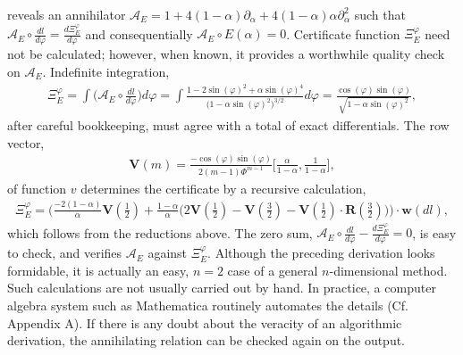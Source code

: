 \documentclass[nofootinbib,preprint]{revtex4-1}
\begin{document}
reveals an annihilator 
$\mathcal{A}_E = 1 + 4(1-\alpha)\partial_{\alpha} + 4(1-\alpha)\alpha\partial_{\alpha}^2$ such
that $\mathcal{A}_E \circ \frac{dl}{d\varphi} = \frac{d\Xi_E^{\varphi}}{d\varphi}$ and consequentially
$\mathcal{A}_E \circ E(\alpha) = 0$. Certificate function $\Xi_E^{\varphi}$ need not be calculated; 
however, when known, it provides a worthwhile quality check on $\mathcal{A}_E$. Indefinite 
integration, 
\begin{eqnarray}
\Xi_E^{\varphi} = \int \bigg(\mathcal{A}_E \circ \frac{dl}{d\varphi}\bigg) d\varphi 
=\int \frac{1-2\sin(\varphi)^2+\alpha \sin(\varphi)^4}{\big(1-\alpha \sin(\varphi)^2\big)^{3/2}} d\varphi
=  \frac{\cos(\varphi)\sin(\varphi)}{\sqrt{1-\alpha \sin(\varphi)^2}}, \nonumber
\end{eqnarray}
after careful bookkeeping, must agree with a total of exact differentials. The row vector,
\begin{eqnarray}
\mathbf{V}(m)=\frac{-\cos(\varphi)\sin(\varphi)}{2(m-1)\Phi^{m-1}}\bigg[\frac{\alpha}{1-\alpha},\frac{1}{1-\alpha}\bigg], \nonumber
\end{eqnarray}
of function $v$ determines the certificate by a recursive calculation,
\begin{eqnarray}
\Xi_E^{\varphi} = \Bigg(\frac{-2(1-\alpha)}{\alpha}\mathbf{V}(\tfrac{1}{2})
+\frac{1-\alpha}{\alpha}\Big(2\mathbf{V}(\tfrac{1}{2})
-\mathbf{V}(\tfrac{3}{2})-\mathbf{V}(\tfrac{1}{2})\cdot
\mathbf{R}(\tfrac{3}{2}) \Big) \Bigg) \cdot \mathbf{w}(dl), 
\nonumber
\end{eqnarray}
which follows from the reductions above. The zero sum, 
$\mathcal{A}_E \circ \frac{dl}{d\varphi}-\frac{d\Xi_E^{\varphi}}{d\varphi}=0$, is 
easy to check, and verifies $\mathcal{A}_E$ against $\Xi_E^{\varphi}$.
Although the preceding derivation looks formidable, it is actually an 
easy, $n=2$ case of a general $n$-dimensional 
method. Such calculations are not usually carried out by hand. In practice, a 
computer algebra system such as Mathematica routinely automates the details 
(Cf. Appendix A). If there is any doubt about the veracity of an algorithmic 
derivation, the annihilating relation can be checked again on the output. 
\end{document}
